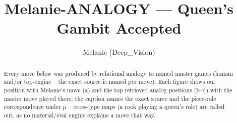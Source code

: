 \documentclass[11pt]{article}
\title{Melanie-ANALOGY — Queen's Gambit Accepted}
\author{Melanie (Deep\_Vision)}
\date{}
\begin{document}
\maketitle

\begin{abstract}Every move below was produced by relational analogy to named master games (human and/or top-engine -- the exact source is named per move). Each figure shows our position with Melanie's move (a) and the top retrieved analog positions (b--d) with the master move played there; the caption names the exact source and the piece-role correspondence under $\mu$ -- cross-type maps (a rook playing a queen's role) are called out, as no material/eval engine explains a move that way.\end{abstract}

\begin{figure}[p]\centering
\begin{subfigure}{0.46\textwidth}\centering
\resizebox{\linewidth}{!}{%
\newchessgame
\chessboard[
  setfen={rnbqkb1r/1p3ppp/p3pn2/2p5/2BP3P/4PN2/PP3PP1/RNBQ1RK1 b kq - 0 7},
  showmover=false,
  pgfstyle=straightmove, color=movearrow, markmove={a6-a5}
]}
\caption{}
\end{subfigure}\hfill
\begin{subfigure}{0.46\textwidth}\centering
\resizebox{\linewidth}{!}{%
\newchessgame
\chessboard[
  setfen={rnbqkb1r/pp3ppp/4pn2/2p5/2BP4/4PN2/PP3PPP/RNBQ1RK1 b kq - 1 7},
  showmover=false,
  pgfstyle=straightmove, color=movearrow, markmove={a7-a6}
]}
\caption{}
\end{subfigure}
\\[4pt]
\begin{subfigure}{0.46\textwidth}\centering
\resizebox{\linewidth}{!}{%
\newchessgame
\chessboard[
  setfen={rnbqkb1r/pp3ppp/4pn2/2p5/2BP4/4PN2/PP3PPP/RNBQ1RK1 b kq - 1 7},
  showmover=false,
  pgfstyle=straightmove, color=movearrow, markmove={a7-a6}
]}
\caption{}
\end{subfigure}\hfill
\begin{subfigure}{0.46\textwidth}\centering
\resizebox{\linewidth}{!}{%
\newchessgame
\chessboard[
  setfen={rnbqkb1r/pp3ppp/4pn2/2p5/2BP4/4PN2/PP3PPP/RNBQ1RK1 b kq - 1 7},
  showmover=false,
  pgfstyle=straightmove, color=movearrow, markmove={a7-a6}
]}
\caption{}
\end{subfigure}

\end{figure}
\end{document}
